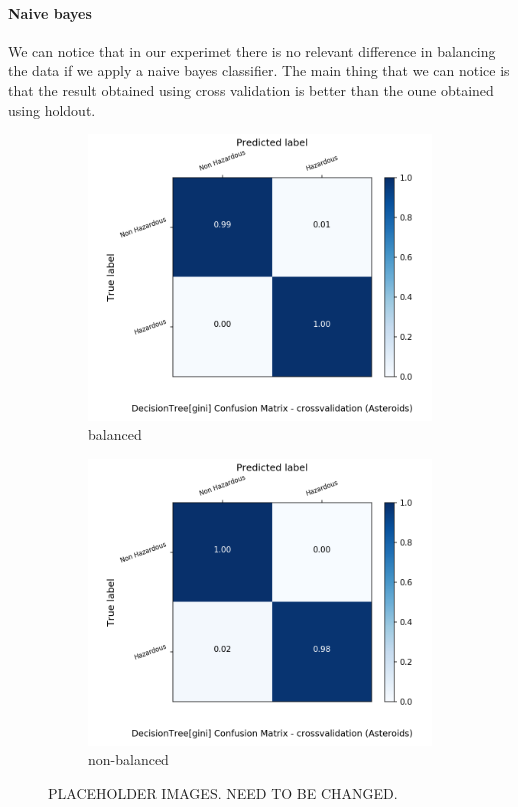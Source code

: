 \documentclass{article}
\begin{document}
\paragraph{Naive bayes}
We can notice that in our experimet there is no relevant difference in balancing the data if we apply a naive bayes classifier.
The main thing that we can notice is that the result obtained using cross validation is better than the oune obtained using holdout.


\begin{figure}[H]
	\centering
	\begin{subfigure}{.5\textwidth}
		\centering
		\includegraphics[width=1.1\textwidth]{Plots/asteroids/asteroids_DecisionTree_gini_balance_True_crossvalidation.png}
		\caption{balanced}
	\end{subfigure}%
	\begin{subfigure}{.5\textwidth}
		\centering
		\includegraphics[width=1.1\textwidth]{Plots/asteroids/asteroids_DecisionTree_gini_balance_False_crossvalidation.png}
		\caption{non-balanced}
	\end{subfigure}
	\caption{{\color{red} PLACEHOLDER IMAGES. NEED TO BE CHANGED.}}
\end{figure}
\end{document}
